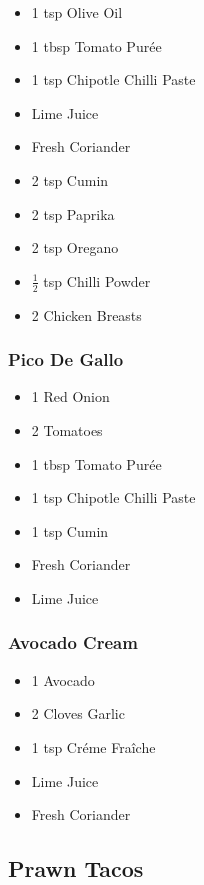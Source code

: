 \documentclass[11pt, english]{article}
\begin{document}
	\begin{itemize}
        \setlength\itemsep{0cm}
                \item 1 tsp Olive Oil
		\item 1 tbsp Tomato Pur\'{e}e
		\item 1 tsp Chipotle Chilli Paste
		\item Lime Juice
		\item Fresh Coriander
		\item 2 tsp Cumin
		\item 2 tsp Paprika
		\item 2 tsp Oregano
		\item $\frac{1}{2}$ tsp Chilli Powder
		\item 2 Chicken Breasts
        \end{itemize}

		\subsubsection*{Pico De Gallo}
	
	\begin{itemize}
        \setlength\itemsep{0cm}
                \item 1 Red Onion
		\item 2 Tomatoes
		\item 1 tbsp Tomato Pur\'{e}e
		\item 1 tsp Chipotle Chilli Paste
		\item 1 tsp Cumin
		\item Fresh Coriander
		\item Lime Juice
        \end{itemize}

		\subsubsection*{Avocado Cream}

	\begin{itemize}
        \setlength\itemsep{0cm}
                \item 1 Avocado
		\item 2 Cloves Garlic
		\item 1 tsp Cr\'{e}me Fra\^{i}che
		\item Lime Juice
		\item Fresh Coriander
        \end{itemize}

\newpage

	\subsection{Prawn Tacos}
\end{document}
